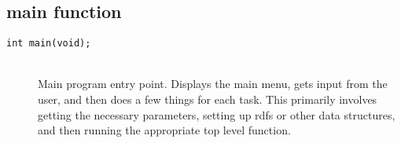 \documentclass {book}
\begin{document}
\subsection{main function}

\begin{description}

\item[\texttt{int main(void);}]
\hfill \\
Main program entry point. Displays the main menu, gets input from the user, and then does a few things for each task. This primarily involves getting the necessary parameters, setting up rdfs or other data structures, and then running the appropriate top level function.

\end{description}
\end{document}

